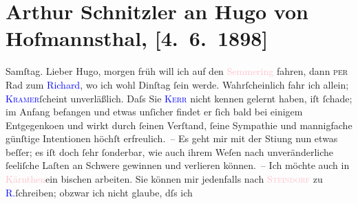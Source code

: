 

               \section[Arthur Schnitzler an Hugo von Hofmannsthal, {[}4. 6. 1898{]}]{ Arthur Schnitzler an Hugo von Hofmannsthal, {[}4. 6. 1898{]}}\nopagebreak{}\rehead{ }\normalsize\beginnumbering{} \toendnotes[C]{\smallbreak\pagebreak[2]} 
\pstart
           \raggedleft{}{\pb}Samſtag.\pend
           \pstart
           Lieber Hugo, morgen früh will ich auf den \textcolor{pink}{Semmering}{}\ledrightnote{\textcolor{pink}{Semmering}} fahren, dann \textsc{per} Rad zum \textcolor{blue}{Richard}{}\ledrightnote{\textcolor{blue}{Richard Beer-Hofmann}}, wo ich wohl
                        Dinſtag{ }ſein werde. Wahrſcheinlich fahr ich allein;
                        \textcolor{blue}{\textsc{Kramer}}{}\ledrightnote{\textcolor{blue}{Leopold Kramer}}{ }ſcheint {\pb}unverläßlich. Daſs Sie \textcolor{blue}{\textsc{Kerr}}{}\ledrightnote{\textcolor{blue}{Alfred Kerr}} nicht kennen gelernt haben, iſt ſchade; im Anfang befangen und etwas
                    unſicher findet er ſich bald bei einigem Entgegenko{\geminationm}en und wirkt durch ſeinen Verſtand, ſeine Sympathie und mannigfache {\pb}günſtige Intentionen höchſt erfreulich. –\pend
           \pstart
           Es geht mir mit der Sti{\geminationm}ung nun etwas beſſer; es iſt
                    doch ſehr ſonderbar, wie auch \strikeout{\textcolor{gray}{ganz feſtſtehende}} ihrem Weſen nach unveränderliche ſeeliſche Laſten an Schwere gewinnen und
                    verlieren können. – Ich möchte auch in \textcolor{pink}{Kärnthen}{}\ledrightnote{\textcolor{pink}{Kärnten}}{ }{\pb}ein bischen arbeiten. Sie können mir jedenfalls nach
                        \textcolor{pink}{\textsc{Steindorf}}{}\ledrightnote{\textcolor{pink}{Steindorf am Ossiacher See}} zu \textcolor{blue}{R.}{}\ledrightnote{\textcolor{blue}{Richard Beer-Hofmann}}{ }ſchreiben; obzwar ich nicht glaube, dſs ich
